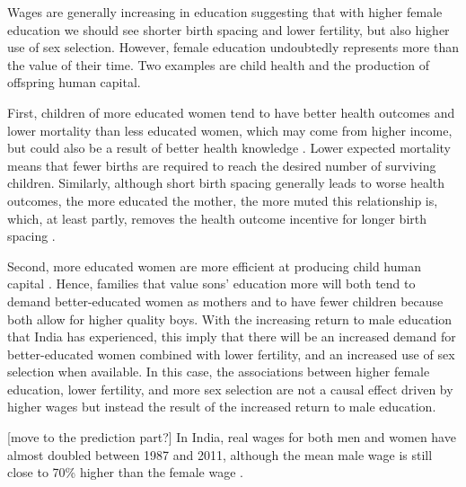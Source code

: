 Wages are generally increasing in education suggesting that with higher female education
we should see shorter birth spacing and lower fertility, but also higher use of sex 
selection.
However, female education undoubtedly represents more than the value of their time.
Two examples are child health and the production of offspring human capital.

First, children of more educated women tend to have better health outcomes and
lower mortality than less educated women, which may come from higher income, but could
also be a result of better health knowledge 
\citep{Rosenzweig1982a,Kovsted2002,Whitworth2002,Maitra2008}.
Lower expected mortality means that fewer births are required to reach the desired
number of surviving children.
Similarly, although short birth spacing generally leads to worse health outcomes, 
the more educated the mother, the more muted this relationship is, which, at least partly,
removes the health outcome incentive for longer birth spacing
\citep{Whitworth2002,Conde-Agudelo2012,Molitoris2019}.

Second, more educated women are more efficient at producing child human capital 
\citep{Behrman1999}.
Hence, families that value sons' education more will both tend to demand better-educated
women as mothers and to have fewer children because both allow for higher quality boys.
With the increasing return to male education that India has experienced, this imply
that there will be an increased demand for better-educated women combined with lower 
fertility, and an increased use of sex selection when available.
In this case, the associations between higher female education, lower fertility, and more
sex selection are not a causal effect driven by higher wages but instead the result of the 
increased return to male education. 








[move to the prediction part?]
In India, real wages for both men and women have almost doubled between 1987 and 
2011, although the mean male wage is still close to 70\% higher than the female wage 
\citep{Klasen2015,Bhargava2018}.






